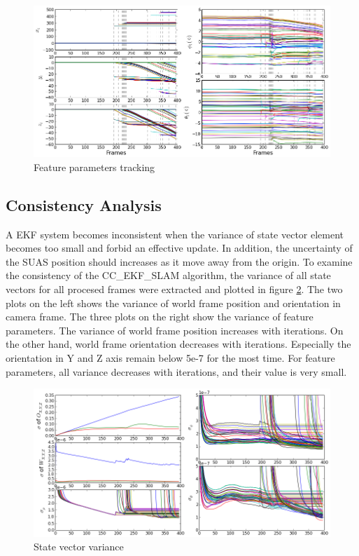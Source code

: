 \begin{figure}[h]
\centering
\includegraphics[width=12cm, keepaspectratio=true]
{./Figures/fltfig/cut1/Figure20.png}
\caption{Feature parameters tracking}
\label{fltfig:2}
\end{figure}

\subsection{Consistency Analysis}
A EKF system becomes inconsistent when the variance of state vector
element becomes too small and forbid an effective update. In addition,
the uncertainty of the SUAS position should increases as it move away
from the origin. To examine the consistency of the CC\_EKF\_SLAM
algorithm, the variance of all state vectors for all procesed frames
were extracted and plotted in figure \ref{fltfig:3}. The two plots on
the left shows the variance of world frame position and orientation in
camera frame. The three plots on the right show the variance of
feature parameters. The variance of world frame position increases
with iterations. On the other hand, world frame orientation decreases
with iterations. Especially the orientation in Y and Z axis remain
below 5e-7 for the most time. For feature parameters, all variance
decreases with iterations, and their value is very small. 
\begin{figure}[h]
\centering
\includegraphics[width=12cm, keepaspectratio=true]
{./Figures/fltfig/cut1/Figure40.png}
\caption{State vector variance}
\label{fltfig:3}
\end{figure}

